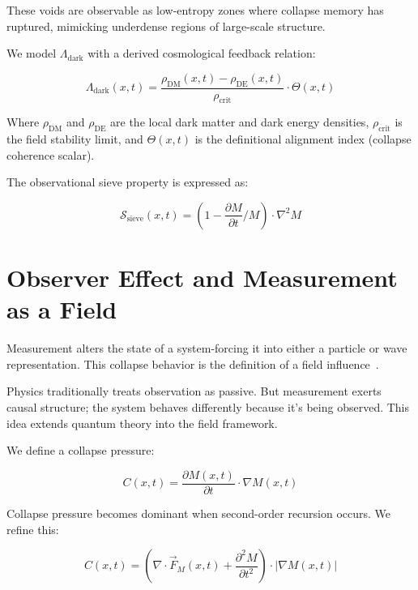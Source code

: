 These voids are observable as low-entropy zones where collapse memory has ruptured, mimicking underdense regions of large-scale structure.

We model $\Lambda_{\text{dark}}$ with a derived cosmological feedback relation:

\begin{equation}
\Lambda_{\text{dark}}(x,t) = \frac{\rho_{\text{DM}}(x,t) - \rho_{\text{DE}}(x,t)}{\rho_{\text{crit}}} \cdot \Theta(x,t)
\end{equation}

Where $\rho_{\text{DM}}$ and $\rho_{\text{DE}}$ are the local dark matter and dark energy densities, $\rho_{\text{crit}}$ is the field stability limit, and $\Theta(x,t)$ is the definitional alignment index (collapse coherence scalar).

The observational sieve property is expressed as:

\begin{equation}
\mathcal{S}_{\text{sieve}}(x,t) = \left(1 - \frac{\partial M}{\partial t}\bigg/ M \right) \cdot \nabla^2 M
\end{equation}

\section{Observer Effect and Measurement as a Field}

Measurement alters the state of a system-forcing it into either a particle or wave representation. This collapse behavior is the definition of a field influence~\cite{penrose1996gravity,pearle_collapse_quantized}.

Physics traditionally treats observation as passive. But measurement exerts causal structure; the system behaves differently because it’s being observed. This idea extends quantum theory into the field framework.

We define a collapse pressure:

\begin{equation}
C(x,t) = \frac{\partial M(x,t)}{\partial t} \cdot \nabla M(x,t)
\end{equation}

Collapse pressure becomes dominant when second-order recursion occurs. We refine this:

\begin{equation}
C(x,t) = \left( \nabla \cdot \vec{F}_M(x,t) + \frac{\partial^2 M}{\partial t^2} \right) \cdot \left| \nabla M(x,t) \right|
\end{equation}

